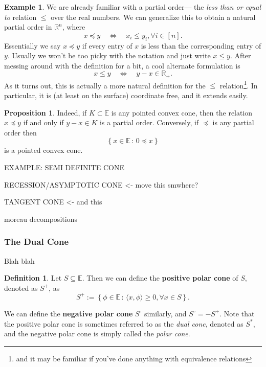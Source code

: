 \documentclass[11pt]{article}
\numberwithin{equation}{section}
\theoremstyle{definition}
\newtheorem{example}[theorem]{Example}
\newtheorem{proposition}[theorem]{Proposition}
\newtheorem{definition}[theorem]{Definition}%
\newcommand{\bE}{\mathbb{E}}
\newcommand{\bR}{\mathbb{R}}
\newcommand{\set}[2]{\left\{#1\,:\,#2\right\}}
\begin{document}
\begin{example}
    We are already familiar with a partial order--- the \textit{less than or equal to} relation $\le$ over the real numbers. We can generalize this to obtain a natural partial order in $\bR^n$, where
    \begin{equation}
        x\preceq y\quad\iff\quad x_i\le y_i, \forall i\in [n].
    \end{equation}
    Essentially we say $x\preceq y$ if every entry of $x$ is less than the corresponding entry of $y$. Usually we won't be too picky with the notation and just write $x\le y$. After messing around with the definition for a bit, a cool alternate formulation is
    \begin{equation}
        x\le y\quad\iff\quad y-x\in\bR_+.
    \end{equation}
    As it turns out, this is actually a more natural definition for the $\le$ relation\footnote{and it may be familiar if you've done anything with equivalence relations}. In particular, it is (at least on the surface) coordinate free, and it extends easily.
\end{example}
\begin{proposition}
    Indeed, if $K\subset\bE$ is any pointed convex cone, then the relation $x\preceq y$ if and only if $y-x\in K$ is a partial order. Conversely, if $\preceq$ is any partial order then
    \begin{equation}
        \set{x\in\bE}{0\preceq x}
    \end{equation}
    is a pointed convex cone.
\end{proposition}

EXAMPLE: SEMI DEFINITE CONE

RECESSION/ASYMPTOTIC CONE <- move this smwhere?

TANGENT CONE <- and this

moreau decompositions

\subsubsection{The Dual Cone}
Blah blah
\begin{definition}
    Let $S\subseteq\bE$. Then we can define the \textbf{positive polar cone} of $S$, denoted as $S^+$, as
    \begin{equation}
        S^+:=\set{\phi\in\bE}{\langle x,\phi\rangle\ge 0,\forall x\in S}.
    \end{equation}
\end{definition}
We can define the \textbf{negative polar cone} $S^\circ $ similarly, and $S^\circ=-S^+$. Note that the positive polar cone is sometimes referred to as the \textit{dual cone}, denoted as $S^*$, and the negative polar cone is simply called the \textit{polar cone}.
\end{document}
